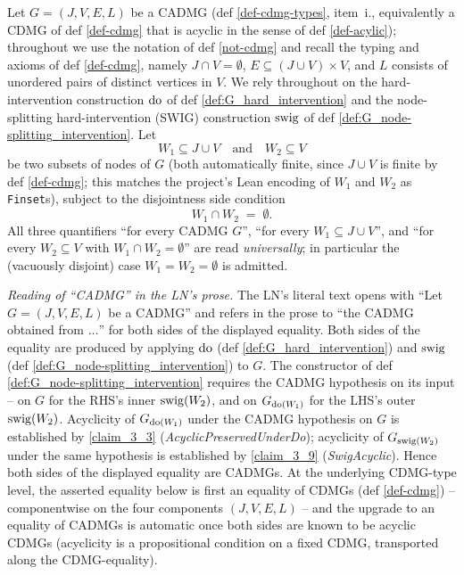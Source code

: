 \documentclass[main]{subfiles}
\begin{document}
\begin{Lem}\label{disjoint-hard-interventions-and-node-splitting-hard-interventions-commute}
    Let $G = (J, V, E, L)$ be a CADMG (def \ref{def-cdmg-types}, item~i., equivalently a CDMG of def \ref{def-cdmg} that is acyclic in the sense of def \ref{def-acylic}); throughout we use the notation of def \ref{not-cdmg} and recall the typing and axioms of def \ref{def-cdmg}, namely $J \cap V = \emptyset$, $E \subseteq (J \cup V) \times V$, and $L$ consists of unordered pairs of distinct vertices in $V$. We rely throughout on the hard-intervention construction $\operatorname{do}$ of def \ref{def:G_hard_intervention} and the node-splitting hard-intervention (SWIG) construction $\mathrm{swig}$ of def \ref{def:G_node-splitting_intervention}. Let
    \[ W_1 \subseteq J \cup V \quad\text{and}\quad W_2 \subseteq V \]
    be two subsets of nodes of $G$ (both automatically finite, since $J \cup V$ is finite by def \ref{def-cdmg}; this matches the project's Lean encoding of $W_1$ and $W_2$ as \texttt{Finset}s), subject to the disjointness side condition
    \[ W_1 \cap W_2 \;=\; \emptyset. \]
    All three quantifiers ``for every CADMG $G$'', ``for every $W_1 \subseteq J \cup V$'', and ``for every $W_2 \subseteq V$ with $W_1 \cap W_2 = \emptyset$'' are read \emph{universally}; in particular the (vacuously disjoint) case $W_1 = W_2 = \emptyset$ is admitted.

    \emph{Reading of ``CADMG'' in the LN's prose.}
    The LN's literal text opens with ``Let $G = (J, V, E, L)$ be a CADMG'' and refers in the prose to ``the CADMG obtained from $\ldots$'' for both sides of the displayed equality. Both sides of the equality are produced by applying $\operatorname{do}$ (def \ref{def:G_hard_intervention}) and $\mathrm{swig}$ (def \ref{def:G_node-splitting_intervention}) to $G$. The constructor of def \ref{def:G_node-splitting_intervention} requires the CADMG hypothesis on its input -- on $G$ for the RHS's inner $\mathrm{swig}(W_2)$, and on $G_{\operatorname{do}(W_1)}$ for the LHS's outer $\mathrm{swig}(W_2)$. Acyclicity of $G_{\operatorname{do}(W_1)}$ under the CADMG hypothesis on $G$ is established by \ref{claim_3_3} (\emph{AcyclicPreservedUnderDo}); acyclicity of $G_{\mathrm{swig}(W_2)}$ under the same hypothesis is established by \ref{claim_3_9} (\emph{SwigAcyclic}). Hence both sides of the displayed equality are CADMGs. At the underlying CDMG-type level, the asserted equality below is first an equality of CDMGs (def \ref{def-cdmg}) -- componentwise on the four components $(J, V, E, L)$ -- and the upgrade to an equality of CADMGs is automatic once both sides are known to be acyclic CDMGs (acyclicity is a propositional condition on a fixed CDMG, transported along the CDMG-equality).


\end{Lem}
\end{document}
